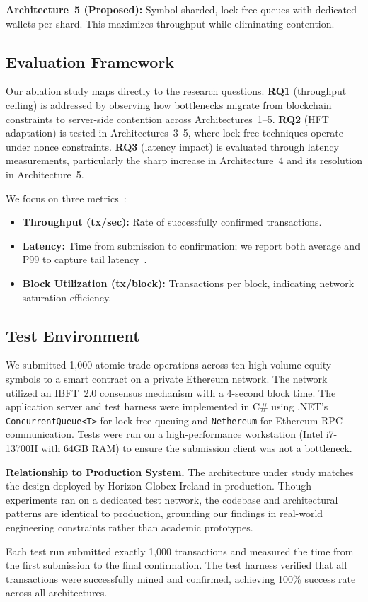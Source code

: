 \textbf{Architecture~5 (Proposed):} Symbol-sharded, lock-free queues with dedicated wallets per shard. This maximizes throughput while eliminating contention.

\subsection{Evaluation Framework}

Our ablation study maps directly to the research questions. \textbf{RQ1} (throughput ceiling) is addressed by observing how bottlenecks migrate from blockchain constraints to server-side contention across Architectures~1--5. \textbf{RQ2} (HFT adaptation) is tested in Architectures~3--5, where lock-free techniques operate under nonce constraints. \textbf{RQ3} (latency impact) is evaluated through latency measurements, particularly the sharp increase in Architecture~4 and its resolution in Architecture~5.

We focus on three metrics~\cite{john2007performance}:
\begin{itemize}
    \item \textbf{Throughput (tx/sec):} Rate of successfully confirmed transactions.
    \item \textbf{Latency:} Time from submission to confirmation; we report both average and P99 to capture tail latency~\cite{dean2013tail}.
    \item \textbf{Block Utilization (tx/block):} Transactions per block, indicating network saturation efficiency.
\end{itemize}

\subsection{Test Environment}

We submitted 1,000 atomic trade operations across ten high-volume equity symbols to a smart contract on a private Ethereum network. The network utilized an IBFT~2.0 consensus mechanism with a 4-second block time. The application server and test harness were implemented in C\# using .NET's \texttt{ConcurrentQueue<T>} for lock-free queuing and \texttt{Nethereum} for Ethereum RPC communication. Tests were run on a high-performance workstation (Intel i7-13700H with 64GB RAM) to ensure the submission client was not a bottleneck.

\textbf{Relationship to Production System.} The architecture under study matches the design deployed by Horizon Globex Ireland in production. Though experiments ran on a dedicated test network, the codebase and architectural patterns are identical to production, grounding our findings in real-world engineering constraints rather than academic prototypes.

Each test run submitted exactly 1,000 transactions and measured the time from the first submission to the final confirmation. The test harness verified that all transactions were successfully mined and confirmed, achieving 100\% success rate across all architectures.

